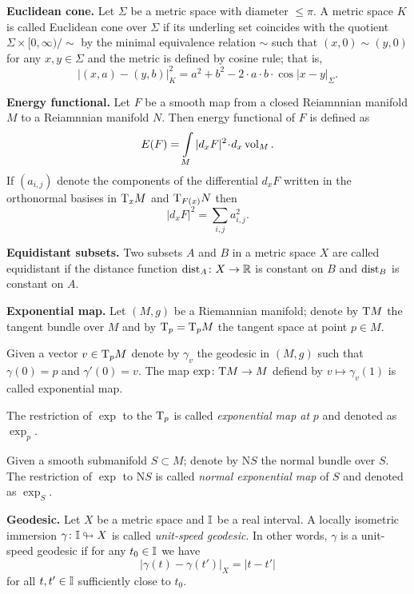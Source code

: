 \begin{description}
\item{\bf Euclidean cone.}\label{Euclidean cone} 
Let $\Sigma$ be a metric space with diameter $\le \pi$. 
A metric space $K$ is called Euclidean cone over $\Sigma$
if its underling set 
coincides with the quotient 
$\Sigma\times [0,\infty)/{\sim}$
by the minimal equivalence relation $\sim$ such that $(x,0)\sim(y,0)$ for any $x,y\in \Sigma$
and the metric is defined by cosine rule;
that is,
$$|(x,a)-(y,b)|^2_K=a^2+b^2-2\cdot a\cdot b\cdot\!\cos|x-y|_\Sigma.$$

\item{\bf Energy functional.}\label{Energy functional} Let $F$ be a smooth map from a closed Reiamnnian manifold $M$ to a Reiamnnian manifold $N$.
Then energy functional of $F$ is defined as
\[E(F)=\int\limits_M |d_xF|^2\cdot d_x\vol_M.\]
If $(a_{i,j})$ denote the components 
of the differential $d_xF$ 
written in the orthonormal basises in $\mathrm{T}_xM$ and $\mathrm{T}_{F(x)}N$
then 
\[|d_xF|^2=\sum_{i,j}a_{i,j}^2.\]

\item{\bf Equidistant subsets.}\label{Equidistant subsets} 
Two subsets $A$ and $B$ in a metric space $X$ are called equidistant if the distance function $\operatorname{\rm dist}_A\colon X\to\mathbb{R}$ is constant on $B$ and $\operatorname{\rm dist}_B$ is constant on $A$.

\item{\bf Exponential map.}\label{Exponential map} 
Let $(M,g)$ be a Riemannian manifold;
denote by $\mathrm{T} M$ the tangent bundle over $M$ and by $\mathrm{T}_p=\mathrm{T}_pM$ the tangent space at point $p\in M$.

Given a vector $v\in\mathrm{T}_pM$ denote by $\gamma_v$ the geodesic in $(M,g)$
such that $\gamma(0)=p$ and $\gamma'(0)=v$.
The map $\exp\colon\mathrm{T} M\to M$ defiend by $v\mapsto \gamma_v(1)$ is called exponential map.

The restriction of $\exp$ to the $\mathrm{T}_p$ is called \emph{exponential map at} $p$ and denoted as $\exp_p$.

Given a smooth submanifold $S\subset M$;
denote by $\mathrm{N} S$ the normal bundle over $S$.
The restriction of $\exp$ to $\mathrm{N} S$ is called \emph{normal exponential map} of $S$ and denoted as $\exp_S$. 

\item{\bf Geodesic.}\label{Geodesic}  
Let $X$ be a metric space and $\mathbb{I}$ be a real interval.
A locally isometric immersion $\gamma\colon\mathbb{I}\looparrowright X$ is called \emph{unit-speed geodesic}.
In other words, $\gamma$ is a unit-speed geodesic
if for any $t_0\in\mathbb{I}$ we have 
$$|\gamma(t)-\gamma(t')|_X=|t-t'|$$ 
for all $t,t'\in\mathbb{I}$ sufficiently close to $t_0$.


\end{description}
